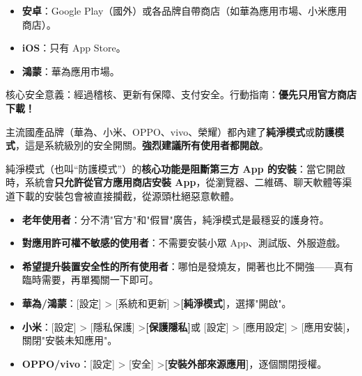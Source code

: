 


\begin{itemize}
  \item \textbf{安卓}：Google Play（國外）或各品牌自帶商店（如華為應用市場、小米應用商店）。
  \item \textbf{iOS}：只有 App Store。
  \item \textbf{鴻蒙}：華為應用市場。
\end{itemize}

核心安全意義：經過稽核、更新有保障、支付安全。行動指南：\textbf{優先只用官方商店下載！}


主流國產品牌（華為、小米、OPPO、vivo、榮耀）都內建了\textbf{純淨模式}或\textbf{防護模式}，這是系統級別的安全開關。\textbf{強烈建議所有使用者都開啟}。


純淨模式（也叫“防護模式”）的\textbf{核心功能是阻斷第三方 App 的安裝}：當它開啟時，系統會\textbf{只允許從官方應用商店安裝 App}，從瀏覽器、二維碼、聊天軟體等渠道下載的安裝包會被直接攔截，從源頭杜絕惡意軟體。


\begin{itemize}
  \item \textbf{老年使用者}：分不清"官方"和"假冒"廣告，純淨模式是最穩妥的護身符。
  \item \textbf{對應用許可權不敏感的使用者}：不需要安裝小眾 App、測試版、外服遊戲。
  \item \textbf{希望提升裝置安全性的所有使用者}：哪怕是發燒友，開著也比不開強——真有臨時需要，再單獨關一下即可。
\end{itemize}


\begin{itemize}
  \item \textbf{華為/鴻蒙}：[設定] > [系統和更新] >\textbf{[純淨模式]}，選擇"開啟"。
  \item \textbf{小米}：[設定] > [隱私保護] >\textbf{[保護隱私]}或 [設定] > [應用設定] > [應用安裝]，關閉"安裝未知應用"。
  \item \textbf{OPPO/vivo}：[設定] > [安全] >\textbf{[安裝外部來源應用]}，逐個關閉授權。
\end{itemize}

